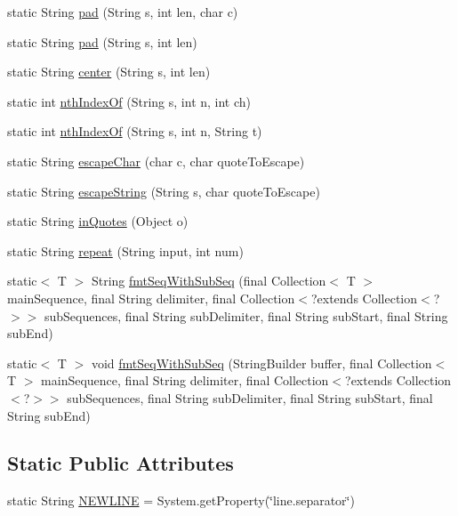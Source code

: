 \begin{DoxyCompactItemize}
\item 
static String \hyperlink{classorg_1_1tzi_1_1use_1_1util_1_1_string_util_aef73c38bf66f12a50383c097e3d47496}{pad} (String s, int len, char c)
\item 
static String \hyperlink{classorg_1_1tzi_1_1use_1_1util_1_1_string_util_a6b2b5ca2d57b606e498c5423e8e5994d}{pad} (String s, int len)
\item 
static String \hyperlink{classorg_1_1tzi_1_1use_1_1util_1_1_string_util_a4c3b8a0a68013ba4b9e5ccb1a48fd9c4}{center} (String s, int len)
\item 
static int \hyperlink{classorg_1_1tzi_1_1use_1_1util_1_1_string_util_a36ed07fc6fc803714d054dd3812d7252}{nth\-Index\-Of} (String s, int n, int ch)
\item 
static int \hyperlink{classorg_1_1tzi_1_1use_1_1util_1_1_string_util_a453cdaf3db2735d03f5bf32f255b3868}{nth\-Index\-Of} (String s, int n, String t)
\item 
static String \hyperlink{classorg_1_1tzi_1_1use_1_1util_1_1_string_util_a64e4f14c2a566673b223aab8786e4fa2}{escape\-Char} (char c, char quote\-To\-Escape)
\item 
static String \hyperlink{classorg_1_1tzi_1_1use_1_1util_1_1_string_util_aa5b149bb160b7ed17ed0daa8bc95ec7a}{escape\-String} (String s, char quote\-To\-Escape)
\item 
static String \hyperlink{classorg_1_1tzi_1_1use_1_1util_1_1_string_util_aa29240771443b5832eb7bece7aa7b0e2}{in\-Quotes} (Object o)
\item 
static String \hyperlink{classorg_1_1tzi_1_1use_1_1util_1_1_string_util_ac4dfdc0e31af10060456b2e91da66c53}{repeat} (String input, int num)
\item 
static$<$ T $>$ String \hyperlink{classorg_1_1tzi_1_1use_1_1util_1_1_string_util_a2e557ad9f0ed76c9e1020dad5d58e3a5}{fmt\-Seq\-With\-Sub\-Seq} (final Collection$<$ T $>$ main\-Sequence, final String delimiter, final Collection$<$?extends Collection$<$?$>$$>$ sub\-Sequences, final String sub\-Delimiter, final String sub\-Start, final String sub\-End)
\item 
static$<$ T $>$ void \hyperlink{classorg_1_1tzi_1_1use_1_1util_1_1_string_util_a7147953237f6ea0d31bcc2e2ceb1e28b}{fmt\-Seq\-With\-Sub\-Seq} (String\-Builder buffer, final Collection$<$ T $>$ main\-Sequence, final String delimiter, final Collection$<$?extends Collection$<$?$>$$>$ sub\-Sequences, final String sub\-Delimiter, final String sub\-Start, final String sub\-End)
\end{DoxyCompactItemize}
\subsection*{Static Public Attributes}
\begin{DoxyCompactItemize}
\item 
static String \hyperlink{classorg_1_1tzi_1_1use_1_1util_1_1_string_util_afc0a72ecb58655d358e4ac44e4528562}{N\-E\-W\-L\-I\-N\-E} = System.\-get\-Property(\char`\"{}line.\-separator\char`\"{})
\end{DoxyCompactItemize}


